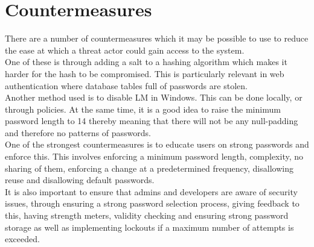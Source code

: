 \section{Countermeasures}
There are a number of countermeasures which it may be possible to use to reduce the ease at which a threat actor could gain access to the system. \\

One of these is through adding a salt to a hashing algorithm which makes it harder for the hash to be compromised. This is particularly relevant in web authentication where database tables full of passwords are stolen. \\

Another method used is to disable LM in Windows. This can be done locally, or through policies. At the same time, it is a good idea to raise the minimum password length to 14 thereby meaning that there will not be any null-padding and therefore no patterns of passwords. \\

One of the strongest countermeasures is to educate users on strong passwords and enforce this. This involves enforcing a minimum password length, complexity, no sharing of them, enforcing a change at a predetermined frequency, disallowing reuse and disallowing default passwords.\\

It is also important to ensure that admins and developers are aware of security issues, through ensuring a strong password selection process, giving feedback to this, having strength meters, validity checking and ensuring strong password storage as well as implementing lockouts if a maximum number of attempts is exceeded. 